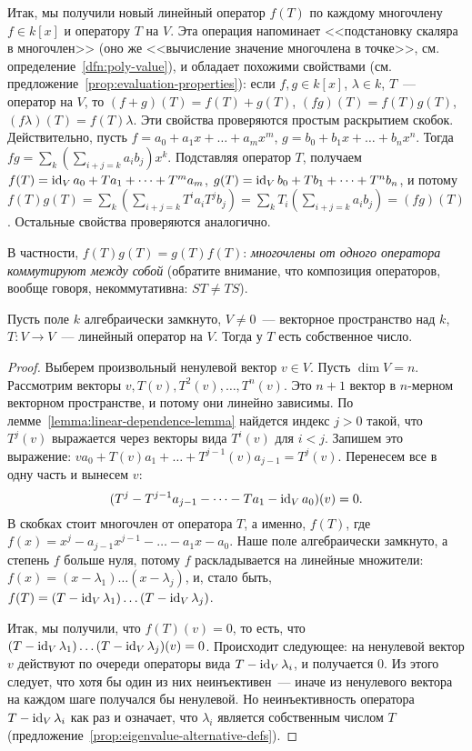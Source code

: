 Итак, мы получили новый линейный оператор $f(T)$ по каждому многочлену
$f\in k[x]$ и оператору $T$ на $V$.
Эта операция напоминает <<подстановку скаляра в многочлен>>
(оно же <<вычисление значение многочлена в точке>>,
см. определение~\ref{dfn:poly-value}), и обладает
похожими свойствами (см. предложение~\ref{prop:evaluation-properties}):
если $f,g\in k[x]$, $\lambda\in k$, $T$~--- оператор на $V$,
то $(f+g)(T) = f(T) + g(T)$, $(fg)(T) = f(T)g(T)$,
$(f\lambda)(T) = f(T)\lambda$.
Эти свойства проверяются простым раскрытием скобок. Действительно,
пусть $f = a_0 + a_1x + \dots + a_mx^m$, 
$g = b_0 + b_1x + \dots + b_nx^n$.
Тогда $fg = \sum_k\left(\sum_{i+j=k}a_ib_j\right)x^k$.
Подставляя оператор $T$, получаем
$f(T) = \operatorname{id}_V a_0 + Ta_1 + \dots + T^m a_m$,
$g(T) = \operatorname{id}_V b_0 + Tb_1 + \dots + T^n b_n$,
и потому
$f(T)g(T) = \sum_k\left(\sum_{i+j=k}T^i a_i T^j b_j\right)
= \sum_k T_i\left(\sum_{i+j=k}a_i b_j\right)
= (fg)(T)$. Остальные свойства проверяются аналогично.

В частности, $f(T)g(T) = g(T)f(T)$: {\em многочлены от одного
оператора коммутируют между собой} (обратите внимание, что
композиция операторов, вообще говоря, некоммутативна:
$ST\neq TS$).

\begin{proposition}\label{prop:operator-has-an-eigenvalue}
Пусть поле $k$ алгебраически замкнуто, $V\neq 0$~---
векторное пространство над $k$, $T\colon V\to V$~---
линейный оператор на $V$.
Тогда у $T$ есть собственное число.
\end{proposition}
\begin{proof}
Выберем произвольный ненулевой вектор $v\in V$.
Пусть $\dim V = n$. Рассмотрим векторы
$v,T(v),T^2(v),\dots,T^n(v)$.
Это $n+1$ вектор в $n$-мерном векторном пространстве,
и потому они линейно зависимы.
По лемме~\ref{lemma:linear-dependence-lemma} найдется индекс
$j>0$ такой, что $T^j(v)$ выражается через векторы вида
$T^i(v)$ для $i<j$. Запишем это выражение:
$v a_0 + T(v) a_1 + \dots + T^{j-1}(v) a_{j-1} = T^j(v)$.
Перенесем все в одну часть и вынесем $v$:
$$
(T^j - T^{j-1}a_{j-1} - \dots - T a_1 - \operatorname{id}_V a_0)(v) = 0.
$$
В скобках стоит многочлен от оператора $T$, а именно, $f(T)$,
где $f(x) = x^j - a_{j-1}x^{j-1} - \dots - a_1x - a_0$.
Наше поле алгебраически замкнуто, а степень $f$ больше нуля,
потому $f$ раскладывается на линейные множители:
$f(x) = (x - \lambda_1)\dots(x-\lambda_j)$, и, стало быть,
$f(T) = (T - \operatorname{id}_V\lambda_1)\dots(T-\operatorname{id}_V\lambda_j)$.

Итак, мы получили, что $f(T)(v) = 0$, то есть, что
$(T-\operatorname{id}_V\lambda_1)\dots (T-\operatorname{id}_V\lambda_j)(v) = 0$.
Происходит следующее: на ненулевой вектор $v$ действуют по очереди
операторы вида $T - \operatorname{id}_V\lambda_i$, и получается $0$. Из этого
следует, что хотя бы один из них неинъективен~--- иначе из ненулевого
вектора на каждом шаге получался бы ненулевой.
Но неинъективность оператора $T - \operatorname{id}_V\lambda_i$ как раз и означает,
что $\lambda_i$ является собственным числом $T$
(предложение~\ref{prop:eigenvalue-alternative-defs}).
\end{proof}

